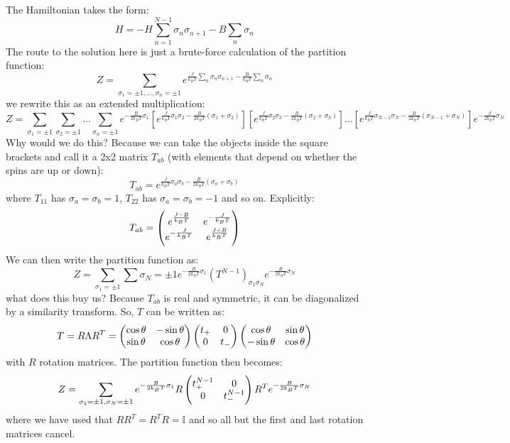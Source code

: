 The Hamiltonian takes the form:
\begin{equation}
    H = -H\sum_{n=1}^{N-1}\sigma_n \sigma_{n+1} - B\sum_n \sigma_n
\end{equation}
The route to the solution here is just a brute-force calculation of the partition function:
\begin{equation}
    Z = \sum_{\sigma_1 = \pm 1, \ldots, \sigma_n = \pm 1} e^{\frac{J}{k_B T}\sum_n \sigma_n \sigma_{n+1} - \frac{B}{k_B T}\sum_{n}\sigma_n}
\end{equation}
we rewrite this as an extended multiplication:
\begin{equation}
    Z = \sum_{\sigma_1 = \pm 1} \sum_{\sigma_2 = \pm 1} \ldots \sum_{\sigma_n = \pm 1}e^{-\frac{B}{2k_B T}\sigma_1}\left[e^{\frac{J}{k_B T}\sigma_1 \sigma_2 - \frac{B}{2k_B T}(\sigma_1 + \sigma_2)}\right]\left[e^{\frac{J}{k_B T}\sigma_2 \sigma_3 - \frac{B}{2k_B T}(\sigma_2 + \sigma_3)}\right] \ldots \left[e^{\frac{J}{k_B T}\sigma_{N-1} \sigma_N - \frac{B}{2k_B T}(\sigma_{N-1} + \sigma_N)}\right]e^{-\frac{\beta}{2k_B T}\sigma_N}
\end{equation}
Why would we do this? Because we can take the objects inside the square brackets and call it a 2x2 matrix $T_{ab}$ (with elements that depend on whether the spins are up or down):
\begin{equation}
    T_{ab} = e^{\frac{J}{k_B T}\sigma_a \sigma_b - \frac{B}{2k_B T}(\sigma_a + \sigma_b)}
\end{equation}
where $T_{11}$ has $\sigma_a = \sigma_b = 1$, $T_{22}$ has $\sigma_a = \sigma_b = -1$ and so on. Explicitly:
\begin{equation}
    T_{ab} = \begin{pmatrix}e^{\frac{J-B}{k_B T}} & e^{-\frac{J}{k_B T}} \\ e^{-\frac{J}{k_B T}} & e^{\frac{J + B}{k_B T}}\end{pmatrix}
\end{equation}
We can then write the partition function as:
\begin{equation}
    Z = \sum_{\sigma_1 = \pm 1}\sum{\sigma_N = \pm 1} e^{-\frac{B}{2k_B T}\sigma_1}(T^{N-1})_{\sigma_1\sigma_N} e^{-\frac{B}{2k_B T}\sigma_N}
\end{equation}
what does this buy us? Because $T_{ab}$ is real and symmetric, it can be diagonalized by a similarity transform. So, $T$ can be written as:
\begin{equation}
    T = R\Lambda R^T = \begin{pmatrix}\cos\theta & -\sin\theta \\ \sin\theta & \cos\theta\end{pmatrix}\begin{pmatrix}t_+ & 0 \\ 0 & t_-\end{pmatrix}\begin{pmatrix}\cos\theta & \sin\theta \\ -\sin\theta & \cos\theta\end{pmatrix}
\end{equation}
with $R$ rotation matrices. The partition function then becomes:
\begin{equation}
    Z = \sum_{\sigma_1 = \pm 1, \sigma_N = \pm 1} e^{-\frac{B}{2k_B T}\sigma_1}R\begin{pmatrix}t_+^{N-1} & 0 \\ 0 & t_-^{N-1}\end{pmatrix}R^T e^{-\frac{B}{2k_B T}\sigma_N}
\end{equation}
where we have used that $RR^T = R^TR = \mathbb{I}$ and so all but the first and last rotation matrices cancel. 

